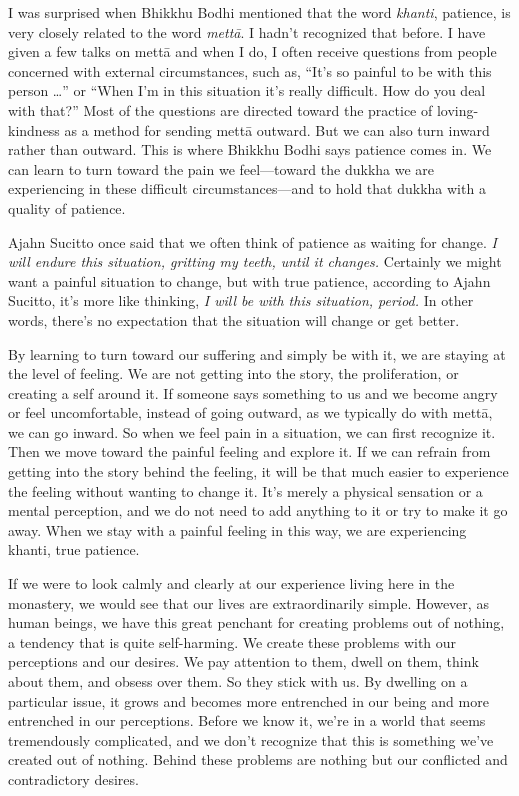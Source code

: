 I was surprised when Bhikkhu Bodhi mentioned that the word 
\emph{khanti}, patience, is very closely related to the word 
\emph{mettā}. I hadn't recognized that before. I have given a few 
talks on mettā and when I do, I often receive questions from people 
concerned with external circumstances, such as, ``It's so painful to be 
with this person \ldots{}'' or ``When I'm in this situation it's really 
difficult. How do you deal with that?'' Most of the questions are 
directed toward the practice of loving-kindness as a method for sending 
mettā outward. But we can also turn inward rather than outward. This 
is where Bhikkhu Bodhi says patience comes in. We can learn to turn 
toward the pain we feel---toward the dukkha we are experiencing in 
these difficult circumstances---and to hold that dukkha with a quality 
of patience.

Ajahn Sucitto once said that we often think of patience as waiting for 
change. \emph{I will endure this situation, gritting my teeth, until it 
changes.} Certainly we might want a painful situation to change, but 
with true patience, according to Ajahn Sucitto, it's more like 
thinking, \emph{I will be with this situation, period.} In other words, 
there's no expectation that the situation will change or get better.

By learning to turn toward our suffering and simply be with it, we are 
staying at the level of feeling. We are not getting into the story, the 
proliferation, or creating a self around it. If someone says something 
to us and we become angry or feel uncomfortable, instead of going 
outward, as we typically do with mettā, we can go inward. So when we 
feel pain in a situation, we can first recognize it. Then we move 
toward the painful feeling and explore it. If we can refrain from 
getting into the story behind the feeling, it will be that much easier 
to experience the feeling without wanting to change it. It's merely a 
physical sensation or a mental perception, and we do not need to add 
anything to it or try to make it go away. When we stay with a painful 
feeling in this way, we are experiencing khanti, true patience.


If we were to look calmly and clearly at our experience living here in 
the monastery, we would see that our lives are extraordinarily simple. 
However, as human beings, we have this great penchant for creating 
problems out of nothing, a tendency that is quite self-harming. We 
create these problems with our perceptions and our desires. We pay 
attention to them, dwell on them, think about them, and obsess over 
them. So they stick with us. By dwelling on a particular issue, it 
grows and becomes more entrenched in our being and more entrenched in 
our perceptions. Before we know it, we're in a world that seems 
tremendously complicated, and we don't recognize that this is something 
we've created out of nothing. Behind these problems are nothing but our 
conflicted and contradictory desires.

